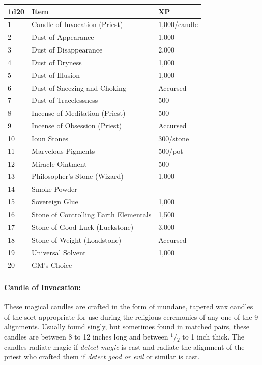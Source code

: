 \begin{multicols}{2}
\noindent \begin{minipage}{\columnwidth}
\noindent \begin{tabular}{|p{}|p{}|p{}|}
\hline
1d20	& Item	& XP \\
\hline\hline
\rowcolor[gray]{0.9}1	& Candle of Invocation (Priest)	& 1,000/candle \\
2	& Dust of Appearance	& 1,000 \\
\rowcolor[gray]{0.9}3	& Dust of Disappearance	& 2,000 \\
4	& Dust of Dryness	& 1,000 \\
\rowcolor[gray]{0.9}5	& Dust of Illusion	& 1,000 \\
6	& Dust of Sneezing and Choking	& Accursed \\
\rowcolor[gray]{0.9}7	& Dust of Tracelessness	& 500 \\
8	& Incense of Meditation (Priest)	& 500 \\
\rowcolor[gray]{0.9}9	& Incense of Obsession (Priest)	& Accursed \\
10	& Ioun Stones	& 300/stone \\
\rowcolor[gray]{0.9}11	& Marvelous Pigments	& 500/pot \\
12	& Miracle Ointment	& 500 \\
\rowcolor[gray]{0.9}13	& Philosopher's Stone (Wizard)	& 1,000 \\
14	& Smoke Powder	& -- \\
\rowcolor[gray]{0.9}15	& Sovereign Glue	& 1,000 \\
16	& Stone of Controlling Earth Elementals	& 1,500 \\
\rowcolor[gray]{0.9}17	& Stone of Good Luck (Luckstone)	& 3,000 \\
18	& Stone of Weight (Loadstone)	& Accursed \\
\rowcolor[gray]{0.9}19	& Universal Solvent	& 1,000 \\
20	& GM's Choice	& -- \\
\hline
\end{tabular}

\end{minipage}

\paragraph{Candle of Invocation:} These magical candles are crafted in the form of mundane, tapered wax candles of the sort appropriate for use during the religious ceremonies of any one of the 9 alignments.  Usually found singly, but sometimes found in matched pairs, these candles are between 8 to 12 inches long and between $^1$/$_2$ to 1 inch thick.  The candles radiate magic if \textit{detect magic} is cast and radiate the alignment of the priest who crafted them if \textit{detect good or evil} or similar is cast.


\end{multicols}
